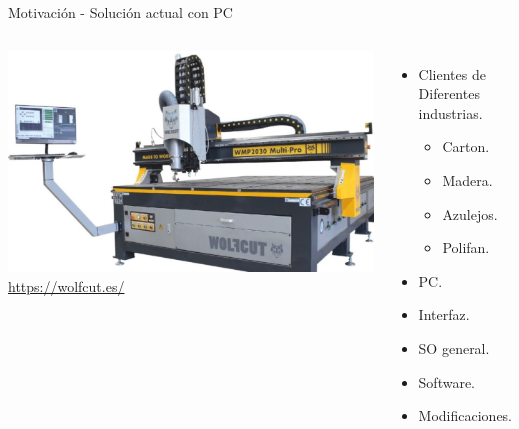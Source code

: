 \documentclass[aspectratio= 43]{beamer}
\begin{document}
\begin{frame}{Motivación - Solución actual con PC}
   \begin{columns}
      \begin{center}
         \includegraphics[width=\textwidth]{./Figures/wolfcut_cnc.jpg} \\
         \href{https://wolfcut.es/}{https://wolfcut.es/}
      \end{center}
      \begin{itemize}
         \item{Clientes de Diferentes industrias.}
      \begin{itemize}
         \item{Carton.}
         \item{Madera.}
         \item{Azulejos.}
         \item{Polifan.}
      \end{itemize}
         \item{PC.}
         \item{Interfaz.}
         \item{SO general.}
         \item{Software.}
         \item{Modificaciones.}
      \end{itemize}
   \end{columns}
\end{frame}
\end{document}
